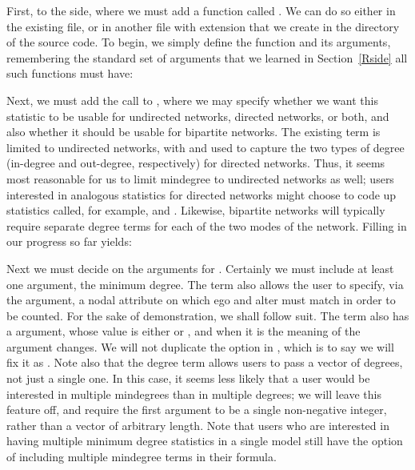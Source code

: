 \documentclass[nojss]{jss}
\begin{document}
First, to the  side, where we must add a function called .  We can do so either in the existing  file, or in another file with extension  that we create in the  directory of the  source code. To begin, we simply define the function and its arguments, remembering the standard set of arguments that we learned in Section~\ref{Rside} all such functions must have:
\begin{CodeChunk}
\begin{CodeInput}
InitErgmTerm.mindegree <- function(nw, arglist, ...) {
\end{CodeInput}
\end{CodeChunk}

Next, we must add the call to , where we may specify
whether we want this statistic to be usable for undirected networks,
directed networks, or both, and also whether it should be usable for bipartite networks.
The existing  term  is limited to undirected networks, with  and  used to capture the two types of degree (in-degree and out-degree, respectively) for directed networks. Thus, it seems most reasonable for us to limit mindegree to undirected networks as well; users interested in analogous statistics for directed networks might choose to code up statistics called, for example,  and . Likewise, bipartite networks will typically require separate degree terms for each of the two modes of the network.
Filling in our progress so far yields:
\begin{CodeChunk}
\begin{CodeInput}
InitErgmTerm.mindegree <- function(nw, arglist, ...) {
  a <- check.ErgmTerm(nw, arglist, directed=FALSE, bipartite=FALSE,
\end{CodeInput}
\end{CodeChunk}
Next we must decide on the arguments for .  Certainly we must include at least one argument, the minimum degree.  The  term also allows the user to specify, via the  argument, a nodal attribute on which ego and alter must match in order to be counted. 
For the sake of demonstration, we shall follow suit.  The  term also has a 
argument, whose value is either  or , and when it is
 the meaning of the  argument changes.  We will not
duplicate the  option in ,
which is to say we will fix it as .
Note also that the degree term allows users to pass a vector of degrees, not just a single one.  In this case, it seems less likely that a user would be interested in multiple mindegrees than in multiple degrees; we will leave this feature off, and require the first argument to be a single non-negative integer, rather than a vector of arbitrary length.  Note that users who are interested in having multiple minimum degree statistics in a single model still have the option of including multiple mindegree terms in their formula.
\end{document}
